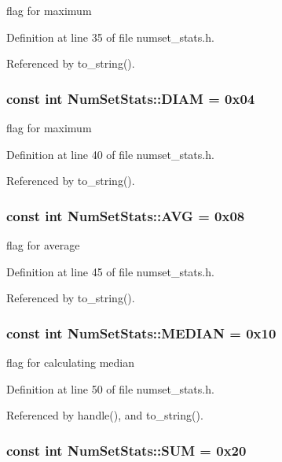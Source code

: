 flag for maximum 

Definition at line 35 of file numset\_\-stats.h.

Referenced by to\_\-string().\hypertarget{class_num_set_stats_b1820301209131d98f7cfab065d0440f}{
\subsubsection[DIAM]{\setlength{\rightskip}{0pt plus 5cm}const int {\bf NumSetStats::DIAM} = 0x04}}
\label{class_num_set_stats_b1820301209131d98f7cfab065d0440f}


flag for maximum 

Definition at line 40 of file numset\_\-stats.h.

Referenced by to\_\-string().\hypertarget{class_num_set_stats_c862317b59207332f5e0c8542ca31ce6}{
\subsubsection[AVG]{\setlength{\rightskip}{0pt plus 5cm}const int {\bf NumSetStats::AVG} = 0x08}}
\label{class_num_set_stats_c862317b59207332f5e0c8542ca31ce6}


flag for average 

Definition at line 45 of file numset\_\-stats.h.

Referenced by to\_\-string().\hypertarget{class_num_set_stats_cc13e2095d277cf2e864e0fcb9504014}{
\subsubsection[MEDIAN]{\setlength{\rightskip}{0pt plus 5cm}const int {\bf NumSetStats::MEDIAN} = 0x10}}
\label{class_num_set_stats_cc13e2095d277cf2e864e0fcb9504014}


flag for calculating median 

Definition at line 50 of file numset\_\-stats.h.

Referenced by handle(), and to\_\-string().\hypertarget{class_num_set_stats_d6d1e1e12eb76587059af855219f02a3}{
\subsubsection[SUM]{\setlength{\rightskip}{0pt plus 5cm}const int {\bf NumSetStats::SUM} = 0x20}}
\label{class_num_set_stats_d6d1e1e12eb76587059af855219f02a3}


